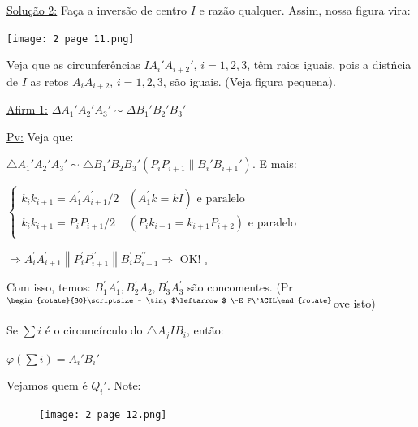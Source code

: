 \documentclass[a4paper,12pt]{article}
\renewcommand{\phi}{\ensuremath{\varphi}}
\theoremstyle{plain} %
\theoremstyle{definition} %
\theoremstyle{remark} %
\newcommand{\rotsupup}[1]{\begin{rotate}{30}\scriptsize ~#1\end{rotate}} %
\begin{document}
	\vspace{1em} 
	
	\begin{framed}
		
		\underline{Solu\c{c}\~ao 2:} Fa\c{c}a a invers\~ao de centro $I$ e raz\~ao qualquer. Assim, nossa figura vira:
		
		\begin{center}
			\texttt{[image: 2 page 11.png]}
		\end{center}
		
		Veja que as circunfer\^encias $IA_i'A_{i+2}'$, $i=1, 2, 3$, t\^em raios iguais, pois a dist\^ncia de $I$ as retos $A_iA_{i+2}$, $i=1, 2, 3$, s\~ao iguais. (Veja figura pequena). 
		
		\underline{Afirm 1:} $\Delta A_1'A_2'A_3'\sim\Delta B_1'B_2'B_3'$
		
		\underline{Pv:} Veja que: 
		
		$\triangle A_{1}' A_{2}' A_{3}' \sim \triangle B_{1}' B_{2} B_{3}'\left(P_{i} P_{i+1} \parallel B_{i}'B_{i+1}'\right)$. E mais:
		
		\begin{center}
			$\left\{\begin{array}{ll}
				k_{i} k_{i+1}=A_{1}^{\prime} A_{i+1}^{\prime} / 2 & \left(A_{1}^{\prime} k=k I\right) \text{ e paralelo}\\ k_{i} k_{i+1}=P_{i} P_{i+1} / 2 & \left(P_{i} k_{i+1}=k_{i+1} P_{i+2}\right) \text{ e paralelo}\\
			\end{array}\right.$
		\end{center}
		
		$\Rightarrow A_{i}^{\prime} A_{i+1}^{\prime}\left\|P_{i}^{\prime} P_{i+1}^{\prime \prime}\right\| B_{i}^{\prime} B_{i+1}^{\prime \prime} \Rightarrow$ OK! $_\square$
		
		Com isso, temos: $B_{1}^{\prime} A_{1}^{\prime}, B_{2}^{\prime} A_{2}, B_{3}^{\prime} A_{3}^{\prime}$ s\~ao concomentes. (Pr$^{\rotsupup{ \tiny $\leftarrow$ \~E F\'ACIL}}$ove isto) \normalsize
		
		Se $\sum i$ \'e o circunc\'irculo do $\triangle A_jIB_i$, ent\~ao:
		
		\begin{center}
			$\phi(\sum i)=A_i'B_i'$
		\end{center}
		
		Vejamos quem \'e $Q_i'$. Note:
		
		\begin{figure}
			\texttt{[image: 2 page 12.png]}
		\end{figure} \, \\
		\, \\
		\, \\
		

\end{framed}
\end{document}
